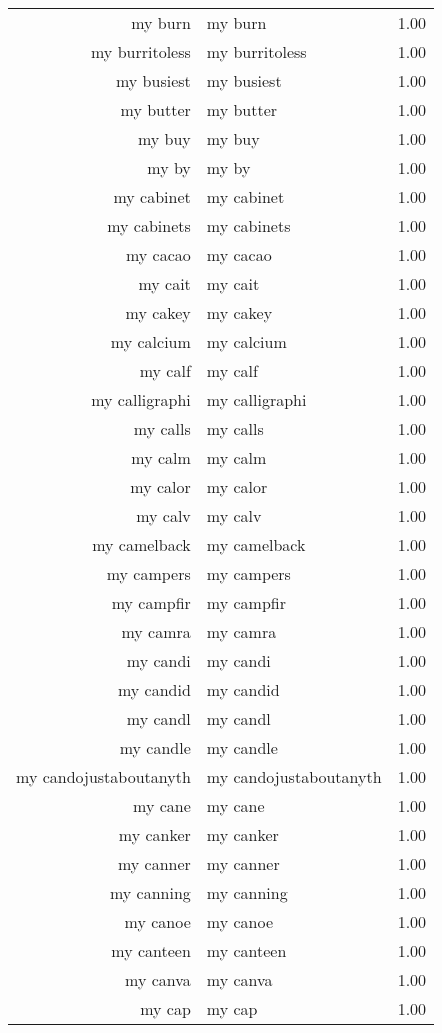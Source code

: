 \begin{table}[ht]
\begin{tabular}{rlr}
  my burn & my burn & 1.00 \\ 
  my burritoless & my burritoless & 1.00 \\ 
  my busiest & my busiest & 1.00 \\ 
  my butter & my butter & 1.00 \\ 
  my buy & my buy & 1.00 \\ 
  my by & my by & 1.00 \\ 
  my cabinet & my cabinet & 1.00 \\ 
  my cabinets & my cabinets & 1.00 \\ 
  my cacao & my cacao & 1.00 \\ 
  my cait & my cait & 1.00 \\ 
  my cakey & my cakey & 1.00 \\ 
  my calcium & my calcium & 1.00 \\ 
  my calf & my calf & 1.00 \\ 
  my calligraphi & my calligraphi & 1.00 \\ 
  my calls & my calls & 1.00 \\ 
  my calm & my calm & 1.00 \\ 
  my calor & my calor & 1.00 \\ 
  my calv & my calv & 1.00 \\ 
  my camelback & my camelback & 1.00 \\ 
  my campers & my campers & 1.00 \\ 
  my campfir & my campfir & 1.00 \\ 
  my camra & my camra & 1.00 \\ 
  my candi & my candi & 1.00 \\ 
  my candid & my candid & 1.00 \\ 
  my candl & my candl & 1.00 \\ 
  my candle & my candle & 1.00 \\ 
  my candojustaboutanyth & my candojustaboutanyth & 1.00 \\ 
  my cane & my cane & 1.00 \\ 
  my canker & my canker & 1.00 \\ 
  my canner & my canner & 1.00 \\ 
  my canning & my canning & 1.00 \\ 
  my canoe & my canoe & 1.00 \\ 
  my canteen & my canteen & 1.00 \\ 
  my canva & my canva & 1.00 \\ 
  my cap & my cap & 1.00 \\ 

\end{tabular}
\end{table}
